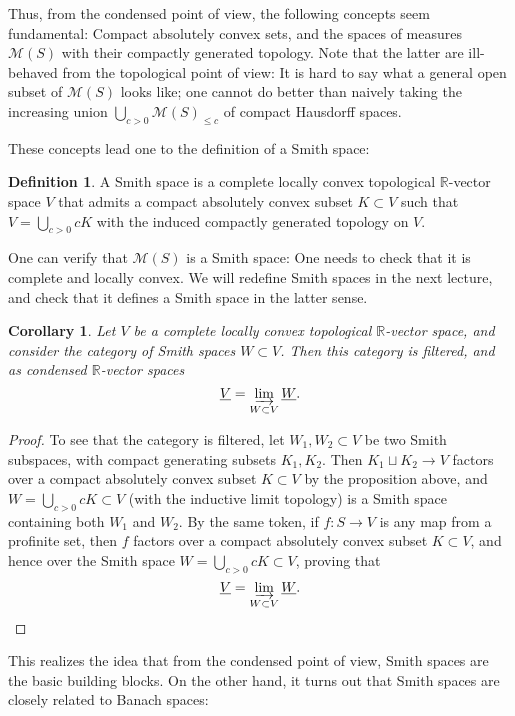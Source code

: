 \documentclass[11pt]{amsbook}
\numberwithin{equation}{section}
\numberwithin{theorem}{section}
\newtheorem{corollary}[theorem]{Corollary}
\theoremstyle{definition}
\newtheorem{definition}[theorem]{Definition}
\begin{document}
Thus, from the condensed point of view, the following concepts seem fundamental: Compact absolutely convex sets, and the spaces of measures $\mathcal M(S)$ with their compactly generated topology. Note that the latter are ill-behaved from the topological point of view: It is hard to say what a general open subset of $\mathcal M(S)$ looks like; one cannot do better than naively taking the increasing union $\bigcup_{c>0} \mathcal M(S)_{\leq c}$ of compact Hausdorff spaces.

These concepts lead one to the definition of a Smith space:

\begin{definition} A Smith space is a complete locally convex topological $\mathbb R$-vector space $V$ that admits a compact absolutely convex subset $K\subset V$ such that $V=\bigcup_{c>0} cK$ with the induced compactly generated topology on $V$.
\end{definition}

One can verify that $\mathcal M(S)$ is a Smith space: One needs to check that it is complete and locally convex. We will redefine Smith spaces in the next lecture, and check that it defines a Smith space in the latter sense.

\begin{corollary} Let $V$ be a complete locally convex topological $\mathbb R$-vector space, and consider the category of Smith spaces $W\subset V$. Then this category is filtered, and as condensed $\mathbb R$-vector spaces
\[
\underline{V} = \varinjlim_{W\subset V} \underline{W}.
\]
\end{corollary}

\begin{proof} To see that the category is filtered, let $W_1,W_2\subset V$ be two Smith subspaces, with compact generating subsets $K_1,K_2$. Then $K_1\sqcup K_2\to V$ factors over a compact absolutely convex subset $K\subset V$ by the proposition above, and $W=\bigcup_{c>0} cK\subset V$ (with the inductive limit topology) is a Smith space containing both $W_1$ and $W_2$. By the same token, if $f: S\to V$ is any map from a profinite set, then $f$ factors over a compact absolutely convex subset $K\subset V$, and hence over the Smith space $W=\bigcup_{c>0} cK\subset V$, proving that
\[
\underline{V} = \varinjlim_{W\subset V} \underline{W}.
\]
\end{proof}

This realizes the idea that from the condensed point of view, Smith spaces are the basic building blocks. On the other hand, it turns out that Smith spaces are closely related to Banach spaces:
\end{document}
